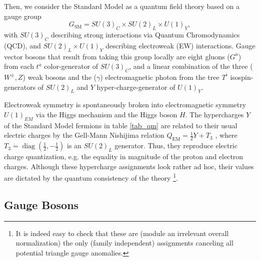 Then, we consider the Standard Model as a quantum field theory based on a gauge group
\begin{equation}
	G_{\mathrm{SM}}=S U(3)_C \times S U(2)_{L} \times U(1)_{Y},
\end{equation}
with $S U(3)_C$ describing strong interactions via Quantum Chromodynamics (QCD), and $S U(2)_{L} \times U(1)_{Y}$ describing electroweak (EW) interactions. Gauge vector bosons that result from taking this group locally are eight gluons ($G^a$) from each $t^a$ color-generator of $SU(3)_C$, and a linear combination of the three ($W^\pm, Z$) weak bosons and the ($\gamma$) electromagnetic photon from the tree $T^i$ isospin-generators of $SU(2)_L$ and $Y$ hyper-charge-generator of $U(1)_Y$.

Electroweak symmetry is spontaneously broken into electromagnetic symmetry $U(1)_{EM}$ via the Higgs mechanism and the Higgs boson $H$. The hypercharges $Y$ of the Standard Model fermions in table \ref{tab_qm} are related to their usual electric charges by the Gell-Mann Nishijima relation $Q_{\mathrm{EM}}=\frac12Y+T_{3}$ \cite{10.1143/PTP.10.581}, where $T_{3}\dot=\operatorname{diag}\left(\frac{1}{2},-\frac{1}{2}\right)$ is an $S U(2)_{L}$ generator.  Thus, they reproduce electric charge quantization, e.g. the equality in magnitude of the proton and electron charges. Although these hypercharge assignments look rather ad hoc, their values are dictated by the quantum consistency of the theory \footnote{It is indeed easy to check that these are (module an irrelevant overall normalization) the only (family independent) assignments canceling all potential triangle gauge anomalies.}. 

\subsection{Gauge Bosons}

